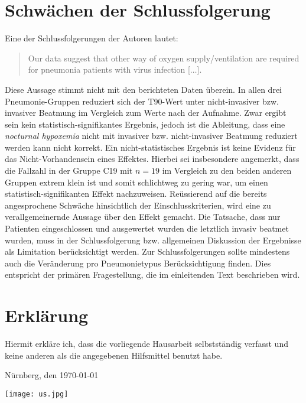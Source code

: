 \documentclass{scrartcl}
\theoremstyle{definition}
\theoremstyle{remark}
\begin{document}
\section{Schwächen der Schlussfolgerung}
Eine der Schlussfolgerungen der Autoren lautet:
		\begin{quotation}
		\noindent Our data suggest that other way of oxygen supply/ventilation are required for pneumonia patients with virus infection [$\ldots$].
	\end{quotation}
 Diese Aussage stimmt nicht mit den berichteten Daten überein. In allen drei Pneumonie-Gruppen reduziert sich der T90-Wert unter nicht-invasiver bzw. invasiver Beatmung im Vergleich zum Werte nach der Aufnahme. Zwar ergibt sein kein statistisch-signifikantes Ergebnis, jedoch ist die Ableitung, dass eine \textit{nocturnal hypoxemia} nicht mit invasiver bzw. nicht-invasiver Beatmung reduziert werden kann nicht korrekt. Ein nicht-statistisches Ergebnis ist keine Evidenz für das Nicht-Vorhandensein eines Effektes. Hierbei sei insbesondere angemerkt, dass die Fallzahl in der Gruppe C19 mit $n=19$ im Vergleich zu den beiden anderen Gruppen extrem klein ist und somit schlichtweg zu gering war, um einen statistisch-signifikanten Effekt nachzuweisen.
Reüssierend auf die bereits angesprochene Schwäche hinsichtlich der Einschlusskriterien, wird eine zu verallgemeinernde Aussage über den Effekt gemacht. Die Tatsache, dass nur Patienten eingeschlossen und ausgewertet wurden die letztlich invasiv beatmet wurden, muss in der Schlussfolgerung bzw. allgemeinen Diskussion der Ergebnisse als Limitation berücksichtigt werden. 
Zur Schlussfolgerungen sollte mindestens auch die Veränderung pro Pneumonietypus Berücksichtigung finden. Dies entspricht der primären Fragestellung, die im einleitenden Text beschrieben wird. 


\newpage
\section{Erklärung}
Hiermit erkläre ich, dass die vorliegende Hausarbeit selbstständig verfasst und keine anderen als die angegebenen Hilfsmittel benutzt habe.



Nürnberg, den \today

\texttt{[image: us.jpg]}







%

%
%

\end{document}
